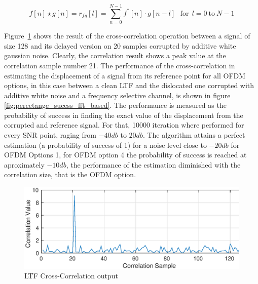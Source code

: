  \begin{equation}
    f[n] \star g[n] = r_{fg}[l] =\sum_{n=0}^{N-1} {f^*[n]\cdot g[n-l]} ~~~\text{for}~~l=0~\text{to}~N-1
    \label{eq:xcorr}
 \end{equation}
 
 
 
 Figure~\ref{fig:xcorr_example} shows the result of the cross-correlation operation between a signal of size 128 and its delayed version on 20 samples corrupted by additive white gaussian noise. Clearly, the correlation result shows a peak value at the correlation sample number 21. The performance of the cross-correlation in estimating the displacement of a signal from its reference point for all OFDM options, in this case between a clean LTF and the dislocated one corrupted with additive white noise and a frequency selective channel, is shown in figure \ref{fig:percetange_sucess_fft_based}. The performance is measured as the probability of success in finding the exact value of the displacement from the corrupted and reference signal. For that, 10000 iteration where performed for every SNR point, raging from $-40db$ to $20db$. The algorithm attains a perfect estimation (a probability of success of 1) for a noise level close to $-20 db$ for OFDM Options 1, for OFDM option 4 the probability of success is reached at aproximately $-10db$, the performance of the estimation diminished with the correlation size, that is the OFDM option. 
 



 \begin{figure}[hbt]
  \centering
    \includegraphics[width=1\textwidth]
      {./figures/correlation_example_20}
  \caption{LTF Cross-Correlation output}
  \label{fig:xcorr_example}
\end{figure}




